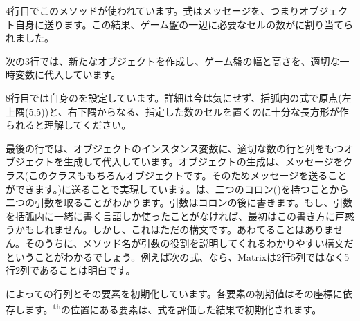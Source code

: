 \documentclass[a4paper,10pt,twoside]{book}
\begin{document}
4行目でこのメソッドが使われています。\st 式はメッセージを、つまりオブジェクト自身に送ります。この結果、ゲーム盤の一辺に必要なセルの数がに割り当てられました。

次の3行では、新たなオブジェクトを作成し、ゲーム盤の幅と高さを、適切な一時変数に代入しています。

8行目では自身のを設定しています。詳細は今は気にせず、括弧内の式で原点(\ie 左上隅(5,5))と、右下隅からなる、指定した数のセルを置くのに十分な長方形が作られると理解してください。

最後の行では、オブジェクトのインスタンス変数に、適切な数の行と列をもつオブジェクトを生成して代入しています。オブジェクトの生成は、メッセージをクラス(このクラスももちろんオブジェクトです。そのためメッセージを送ることができます。)に送ることで実現しています。は、二つのコロン(\ct{:})を持つことから二つの引数を取ることがわかります。引数はコロンの後に書きます。もし、引数を括弧内に一緒に書く言語しか使ったことがなければ、最初はこの書き方に戸惑うかもしれません。しかし、これはただの構文です。あわてることはありません。そのうちに、メソッド名が引数の役割を説明してくれるわかりやすい構文だということがわかるでしょう。例えば次の式、なら、Matrixは2行5列ではなく5行2列であることは明白です。


によっての行列とその要素を初期化しています。各要素の初期値はその座標に依存します。\textsuperscript{th}の位置にある要素は、式を評価した結果で初期化されます。



\end{document}
